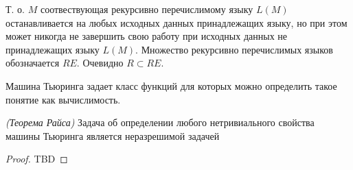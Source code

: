 Т. о. $M$ соотвествующая рекурсивно перечислимому языку $L\left(M\right)$ 
останавливается на любых исходных данных принадлежащих языку, но при
этом может никогда не завершить свою работу при исходных данных не
принадлежащих языку $L\left(M\right)$. Множество рекурсивно
перечислимых языков обозначается $RE$. Очевидно  $R \subset RE$.


Машина Тьюринга задает класс функций для которых можно определить
такое понятие как вычислимость.



\begin{theorem}
\emph{(Теорема Райса)}
Задача об определении любого нетривиального свойства машины Тьюринга
является неразрешимой задачей
\end{theorem}

\begin{proof}
TBD
\end{proof}


